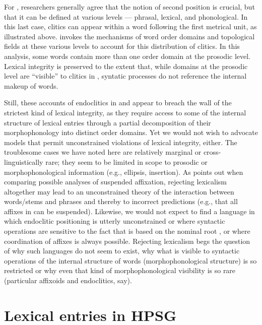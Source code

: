 \documentclass[output=paper
 	        ,biblatex
                ,babelshorthands
                ,newtxmath
                ,draftmode
                ,colorlinks, citecolor=brown
]{langscibook}
\begin{document}
For , researchers generally agree that the notion of second position is crucial, but that it
can be defined at various levels --- phrasal, lexical, and phonological. In this last case, clitics
can appear within a word following the first metrical unit, as illustrated above.
\citet{Dost2007} invokes the mechanisms of word order domains \citep{Reape1994} and topological fields \citep{Kathol2000a} at these various levels to account for this distribution of clitics. In this analysis, some words contain more than one order domain at the prosodic level. Lexical integrity is preserved to the extent that, while domains at the prosodic level are ``visible'' to clitics in , syntatic processes do not reference the internal makeup of words.

Still, these accounts of endoclitics in  and  appear to breach the wall of the strictest kind of lexical integrity, as they require access to some of the internal structure of lexical entries through a partial decomposition of their morphophonology into distinct order domains. Yet we would not wish to advocate models that permit unconstrained violations of lexical integrity, either. The troublesome cases we have noted here are relatively marginal or cross-linguistically rare; they seem to be limited in scope to prosodic or morphophonological information (e.g., ellipsis, insertion). As \citet{Broadwell2008} points out when comparing possible analyses of  suspended affixation, rejecting lexicalism altogether may lead to an unconstrained theory of the interaction between words/stems and phrases and thereby to incorrect predictions (e.g., that all affixes in  can be suspended). Likewise, we would not expect to find a language in which endoclitic positioning is utterly unconstrained or where syntactic operations are sensitive to the fact that  is based on the nominal root , or where coordination of affixes is always possible. Rejecting lexicalism begs the question of why such languages do not seem to exist, why what is visible to syntactic operations of the internal structure of words (morphophonological structure) is so restricted or why even that kind of morphophonological visibility is so rare (particular affixoids and endoclitics, say).


\section{Lexical entries in HPSG}
\end{document}
